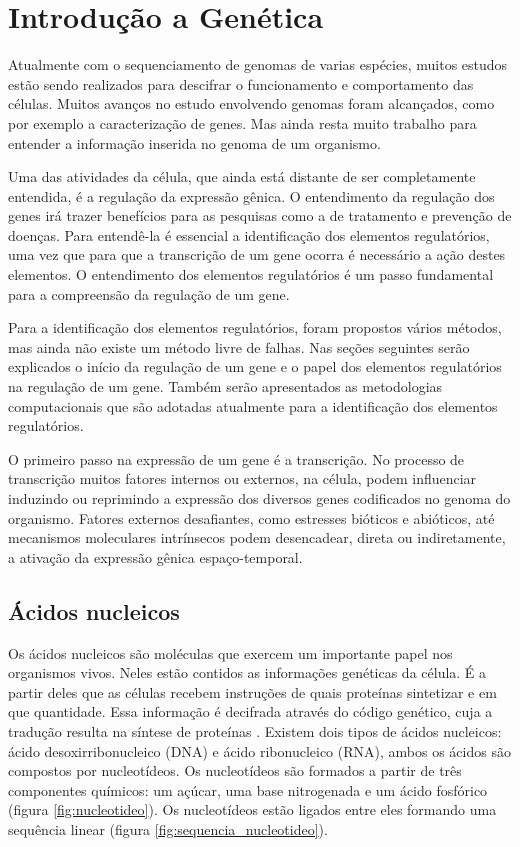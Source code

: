 \chapter{Introdução a Genética} \label{cap:svm}

Atualmente com o sequenciamento de genomas de varias espécies, muitos estudos estão sendo realizados para descifrar o funcionamento e comportamento das células. Muitos avanços no estudo envolvendo genomas foram alcançados, como por exemplo a caracterização de genes. Mas ainda resta muito trabalho para entender a informação inserida no genoma de um organismo.

Uma das atividades da célula, que ainda está distante de ser completamente entendida, é a regulação da expressão gênica. O entendimento da regulação dos genes irá trazer benefícios para as pesquisas como a de tratamento e prevenção de doenças. Para entendê-la é essencial a identificação dos elementos regulatórios, uma vez que para que a transcrição de um gene ocorra é necessário a ação destes elementos. O entendimento dos elementos regulatórios é um passo fundamental para a compreensão da regulação de um gene.

Para a identificação dos elementos regulatórios, foram propostos vários métodos, mas ainda não existe um método livre de falhas. Nas seções seguintes serão explicados o início da regulação de um gene e o papel dos elementos regulatórios na regulação de um gene. Também serão apresentados as metodologias computacionais que são adotadas atualmente para a identificação dos elementos regulatórios.

O primeiro passo na expressão de um gene é a transcrição. No processo de transcrição muitos fatores internos ou externos, na célula, podem influenciar induzindo ou reprimindo a expressão dos diversos genes codificados no genoma do organismo. Fatores externos desafiantes, como estresses bióticos e abióticos, até mecanismos moleculares intrínsecos podem desencadear, direta ou indiretamente, a ativação da expressão gênica espaço-temporal.

\section{Ácidos nucleicos}

Os ácidos nucleicos são moléculas que exercem um importante papel nos organismos vivos. Neles estão contidos as informações genéticas da célula. É a partir deles que as células recebem instruções de quais proteínas sintetizar e em que quantidade. Essa informação é decifrada através do código genético, cuja a tradução resulta na síntese de proteínas \cite{Zaha2000}. Existem dois tipos de ácidos nucleicos: ácido desoxirribonucleico (DNA) e ácido ribonucleico (RNA), ambos os ácidos são compostos por nucleotídeos. Os nucleotídeos são formados a partir de três componentes químicos: um açúcar, uma base nitrogenada e um ácido fosfórico (figura \ref{fig:nucleotideo}). Os nucleotídeos estão ligados entre eles formando uma sequência linear (figura \ref{fig:sequencia_nucleotideo}).

